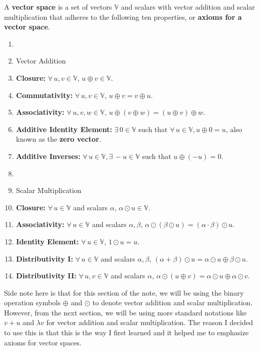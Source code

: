 \documentclass[../main.tex]{subfiles}
\begin{document}
\begin{definition}
A \textbf{vector space} is a set of vectors $\mathbb{V}$ and scalars
with vector addition and scalar multiplication that adheres to the
following ten properties, or \textbf{axioms for a vector space}.
\begin{enumerate}[noitemsep]
\item[]
\item[] Vector Addition
\item[A1.] \textbf{Closure:}
$\forall \, u, v \in \mathbb{V}$, $u \oplus v \in \mathbb{V}$.
\item[A2.] \textbf{Commutativity:}
$\forall \, u, v \in \mathbb{V}$, $u \oplus v = v \oplus u$.
\item[A3.] \textbf{Associativity:}
$\forall \, u, v, w \in \mathbb{V}$, $u \oplus (v \oplus w) =
(u \oplus v) \oplus w$.
\item[A4.] \textbf{Additive Identity Element:}
$\exists \, 0 \in \mathbb{V}$ such that $\forall \, u \in \mathbb{V},
u \oplus 0 = u$, also known as the \textbf{zero vector}.
\item[A5.] \textbf{Additive Inverses:}
$\forall \, u \in \mathbb{V}, \exists \, -u \in \mathbb{V}$ such that
$u \oplus (-u) = 0$.
\item[]
\item[] Scalar Multiplication
\item[S1.] \textbf{Closure:}
$\forall \, u \in \mathbb{V}$ and scalars $\alpha$, $\alpha \odot
u \in \mathbb{V}$.
\item[S2.] \textbf{Associativity:}
$\forall \, u \in \mathbb{V}$ and scalars $\alpha, \beta$,
$\alpha \odot (\beta \odot u) = (\alpha \cdot \beta) \odot u$.
\item[S3.] \textbf{Identity Element:}
$\forall \, u \in \mathbb{V}$, $1 \odot u = u$.
\item[S4.] \textbf{Distributivity I:}
$\forall \, u \in \mathbb{V}$ and scalars $\alpha, \beta$,
$(\alpha + \beta) \odot u = \alpha \odot u \oplus
\beta \odot u$.
\item[S5.] \textbf{Distributivity II:}
$\forall \, u, v \in \mathbb{V}$ and scalars $\alpha$,
$\alpha \odot (u \oplus v) = \alpha \odot u \oplus \alpha \odot v$.
\end{enumerate}
\end{definition}

Side note here is that for this section of the note, we will be using
the binary operation symbols $\oplus$ and $\odot$ to denote vector
addition and scalar multiplication. However, from the next section,
we will be using more standard notations like $v + u$ and $\lambda v$
for vector addition and scalar multiplication. The reason I decided to
use this is that this is the way I first learned and it helped me to
emphasize axioms for vector spaces.
\end{document}
